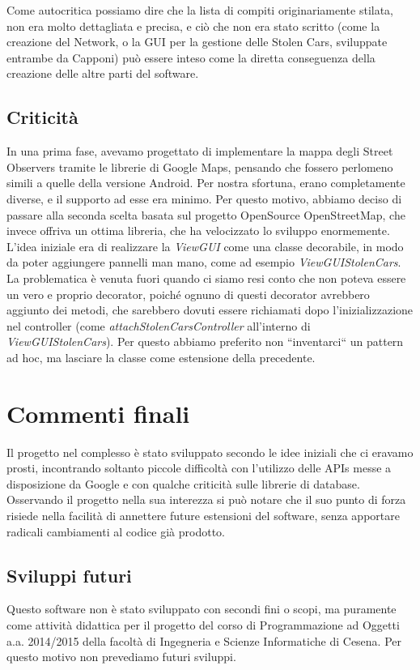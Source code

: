 \documentclass[a4paper,12pt]{report}
\begin{document}
Come autocritica possiamo dire che la lista di compiti originariamente stilata, 
non era molto dettagliata e precisa, e ciò che non era stato scritto (come la 
creazione del Network, o la GUI per la gestione delle Stolen Cars, sviluppate 
entrambe da Capponi) può essere inteso come la diretta conseguenza della 
creazione delle altre parti del software.

  \section{Criticità}
    In una prima fase, avevamo progettato di implementare la mappa degli Street 
Observers tramite le librerie di Google Maps, pensando che fossero 
perlomeno simili a quelle della versione Android. Per nostra sfortuna, 
erano completamente diverse, e il supporto ad esse era minimo. Per questo 
motivo, abbiamo deciso di passare alla seconda scelta basata sul progetto 
OpenSource OpenStreetMap, che invece offriva un ottima libreria, che ha 
velocizzato lo sviluppo enormemente.\newline
    L'idea iniziale era di realizzare la \textit{ViewGUI} come una classe 
decorabile, in modo da poter aggiungere pannelli man mano, come ad esempio 
\textit{ViewGUIStolenCars}. La problematica è venuta fuori quando ci siamo resi 
conto che non poteva essere un vero e proprio decorator, poiché ognuno di 
questi decorator avrebbero aggiunto dei metodi, che sarebbero dovuti essere 
richiamati dopo l'inizializzazione nel controller (come 
\textit{attachStolenCarsController} all'interno di \textit{ViewGUIStolenCars}). 
Per questo abbiamo preferito non ``inventarci`` un pattern ad hoc, ma lasciare 
la classe come estensione della precedente.
    
   
\chapter{Commenti finali}
  Il progetto nel complesso è stato sviluppato secondo le idee iniziali che ci 
eravamo prosti, incontrando soltanto piccole difficoltà con l'utilizzo delle 
APIs messe a disposizione da Google e con qualche criticità sulle librerie di 
database. Osservando il progetto nella sua interezza si può notare che il suo 
punto di forza risiede nella facilità di annettere future estensioni del 
software, senza apportare radicali cambiamenti al codice già prodotto.

  \section{Sviluppi futuri}
  Questo software non è stato sviluppato con secondi fini o scopi, ma puramente 
come attività didattica per il progetto del corso di Programmazione ad Oggetti 
a.a. 2014/2015 della facoltà di Ingegneria e Scienze Informatiche di Cesena. 
Per questo motivo non prevediamo futuri sviluppi.
\end{document}

